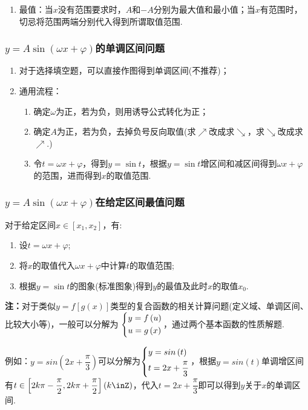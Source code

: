 \documentclass{BHCexam}
\begin{document}
{\begin{enumerate}[1)]
\item 最值：当$ x $没有范围要求时，$  A $和$ -A $分别为最大值和最小值；当$ x $有范围时，切忌将范围两端分别代入得到所谓取值范围.
\end{enumerate}
\subsubsection*{$y=A\sin\left(\omega x+\varphi\right)$的单调区间问题}
\begin{enumerate}[1)]
\item 对于选择填空题，可以直接作图得到单调区间(不推荐)；
\item 通用流程：\begin{enumerate}[1)]
\item 确定$ \omega $为正，若为负，则用诱导公式转化为正；
\item 确定$ A $为正，若为负，去掉负号反向取值(求$\nearrow$改成求$ \searrow $，求$ \searrow $改成求$ \nearrow $.)
\item 令$ t=\omega x+\varphi $，得到$ y=\sin t $，根据$ y=\sin t $增区间和减区间得到$ \omega x+\varphi $的范围，进而得到$ x $的取值范围.
\end{enumerate}
\end{enumerate}
\subsubsection*{$y=A\sin\left(\omega x+\varphi\right)$在给定区间最值问题}\label{123}
对于给定区间$ x\in\left[x_1,x_2\right] $，有:
\begin{enumerate}
\item 设$ t=\omega x+\varphi $;
\item 将$ x $的取值代入$ \omega x+\varphi $中计算$ t$的取值范围;
\item 根据$ y=\sin t $的图象(标准图象)得到$ y $的最值及此时$ x $的取值$ x_0 $.
\end{enumerate}
{\kaishu \textbf{注：}对于类似$ y=f\left[g\left(x\right)\right] $类型的复合函数的相关计算问题(定义域、单调区间、比较大小等)，一般可以分解为 $\begin{dcases}
		y=f\left(u\right)\\
		u=g\left(x\right)
	\end{dcases} $，通过两个基本函数的性质解题.\par
例如：$ y=sin\left(2x+\dfrac{\pi}{3}\right) $可以分解为$\begin{dcases}
	y=sin\left(t\right)\\
	t=2x+\dfrac{\pi}{3}
	\end{dcases}$，根据$ y=sin\left(t\right) $单调增区间有$ t\in\left[2k\pi-\dfrac{\pi}{2},2k\pi+\dfrac{\pi}{2}\right] \left(k\inZ\right)$，代入$ t=2x+\dfrac{\pi}{3} $即可以得到$ y $关于$ x $的单调区间.

}}
\end{document}
